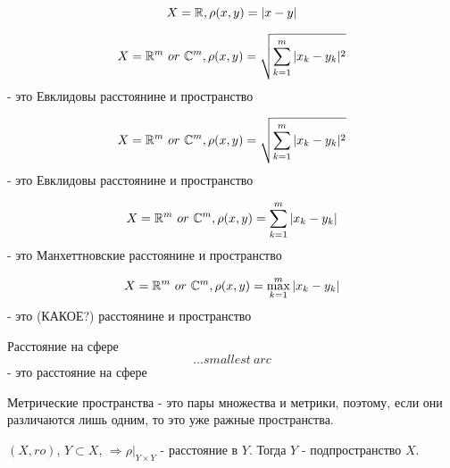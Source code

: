 \documentclass[12pt, a4paper]{article}
\begin{document}
  \begin{example}
  \begin{equation}
    X = {\mathbb{R}}, \rho(x, y) = |x - y|
  \end{equation}
  \end{example}

  \begin{example}
  \begin{equation}
    X = {\mathbb{R}}^m ~ or ~ {\mathbb{C}}^m, \rho(x, y) = \sqrt{\sum_{k = 1}^{m} |x_k - y_k|^2}
  \end{equation} - это Евклидовы расстоянине и пространство
  \end{example}

  \begin{example}
  \begin{equation}
    X = {\mathbb{R}}^m ~ or ~ {\mathbb{C}}^m, \rho(x, y) = \sqrt{\sum_{k = 1}^{m} |x_k - y_k|^2}
  \end{equation} - это Евклидовы расстоянине и пространство
  \end{example}

  \begin{example}
  \begin{equation}
    X = {\mathbb{R}}^m ~ or ~ {\mathbb{C}}^m, \rho(x, y) = \sum_{k = 1}^{m} |x_k - y_k|
  \end{equation} - это Манхеттновские расстоянине и пространство
  \end{example}

  \begin{example}
  \begin{equation}
    X = {\mathbb{R}}^m ~ or ~ {\mathbb{C}}^m, \rho(x, y) = \max_{k = 1}^{m} |x_k - y_k|
  \end{equation} - это (КАКОЕ?) расстоянине и пространство
  \end{example}

  \begin{example}
  Расстояние на сфере
  \begin{equation}
    \dots smallest ~ arc
  \end{equation} - это расстояние на сфере
  \end{example}



  \begin{note}
  Метрические пространства - 
  это пары множества и метрики, 
  поэтому, если они различаются лишь одним, то это уже ражные пространства.
  \end{note}


  \begin{definition}
  [Подпространство]
  $(X, ro)$, $Y \subset X$, 
  $\Rightarrow \rho|_{Y \times Y}$ - расстояние в $Y$.
  Тогда $Y$ - подпространство $X$.
  \end{definition}
\end{document}
